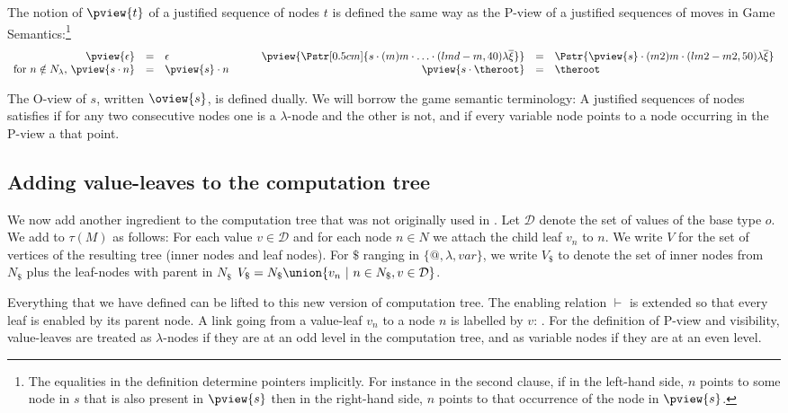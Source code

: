 The notion of  $\pview{t}$ of a justified sequence of nodes $t$ is defined the same way as the P-view of a justified sequences of moves in Game Semantics:\footnote{ The equalities in the
  definition determine pointers implicitly. For instance in the second
  clause, if in the left-hand side, $n$ points to some node in $s$
  that is also present in $\pview{s}$ then in the right-hand side, $n$
  points to that occurrence of the node in $\pview{s}$.}
$$\begin{array}{rclrcl}
\pview{\epsilon} &=&  \epsilon & \pview{\Pstr[0.5cm]{ s \cdot (m) m \cdot \ldots \cdot (lmd-m,40){\lambda\overline{\xi}} }}
 &=& \Pstr{
\pview{s} \cdot (m2) m \cdot (lm2-m2,50) {\lambda \overline{\xi}} } \\
\mbox{for $n \notin N_\lambda$, } \pview{s \cdot n }  &=&  \pview{s} \cdot n \qquad & \pview{s \cdot \theroot }  &=&  \theroot
\end{array}$$

The O-view of $s$, written $\oview{s}$, is defined dually. We will borrow the game semantic terminology: A justified sequences of nodes satisfies  if for any two consecutive nodes one is a $\lambda$-node and the other is not, and  if every variable node points to a node occurring in the P-view a that point.

\subsection{Adding value-leaves to the computation tree}

We now add another ingredient to the computation tree that was not originally used in \cite{OngLics2006}.  Let $\mathcal{D}$ denote the set of values of the base type $o$.  We add
 to $\tau(M)$ as follows: For each value $v
\in \mathcal{D}$ and for each node $n \in N$ we attach the child leaf $v_n$ to $n$.  We write $V$ for the set of vertices of the resulting tree (\ie inner nodes and leaf nodes). For $\$$ ranging in $\{@, \lambda, var \}$, we write $V_\$$ to denote the set of inner nodes from $N_\$$ plus the leaf-nodes with parent in $N_\$$ \ie $V_\$ = N_\$ \union \{ v_n \ | \ n \in N_\$, v \in \mathcal{D} \}$.


Everything that we have defined can be lifted to this new version of computation tree. The enabling relation $\vdash$ is extended so that every leaf is enabled by its parent node. A link going from a value-leaf $v_n$ to a node $n$ is labelled by $v$: . For the definition of P-view and visibility, value-leaves are treated as $\lambda$-nodes if they are at an odd level in the computation tree, and as variable nodes if they are at an even level.

